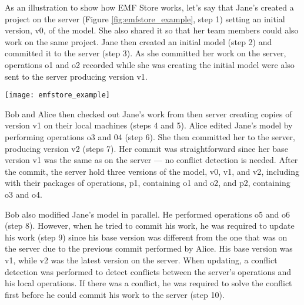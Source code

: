 As an illustration to show how EMF Store works, let's say that Jane's created a project on the server (Figure \ref{fig:emfstore_example}, step 1) setting an initial version, \textsf{v0}, of the model. She also shared it so that her team members could also work on the same project. Jane then created an initial model (step 2) and committed it to the server (step 3). As she committed her work on the server, operations \textsf{o1} and \textsf{o2} recorded while she was creating the initial model were also sent to the server producing version \textsf{v1}.

\begin{figure*}[h]
  \centering
  \texttt{[image: emfstore\_example]}
  \caption{An example to show how EMF Store works.}
  \label{fig:emfstore_example}
\end{figure*}

Bob and Alice then checked out Jane's work from then server creating copies of version \textsf{v1} on their local machines (steps 4 and 5).  Alice edited Jane's model by performing operations \textsf{o3} and \textsf{04} (step 6). She then committed her to the server, producing version \textsf{v2} (steps 7). Her commit was straightforward since her base version \textsf{v1} was the same as on the server --- no conflict detection is needed. After the commit, the server hold three versions of the model, \textsf{v0}, \textsf{v1}, and \textsf{v2}, including with their packages of operations, \textsf{p1}, containing \textsf{o1} and \textsf{o2}, and \textsf{p2}, containing \textsf{o3} and \textsf{o4}.

Bob also modified Jane's model in parallel. He performed operations \textsf{o5} and \textsf{o6} (step 8). However, when he tried to commit his work, he was required to update his work (step 9) since his base version was different from the one that was on the server due to the previous commit performed by Alice. His base version was \textsf{v1}, while \textsf{v2} was the latest version on the server. When updating, a conflict detection was performed to detect conflicts between the server's operations and his local operations. If there was a conflict, he was required to solve the conflict first before he could commit his work to the server (step 10).

